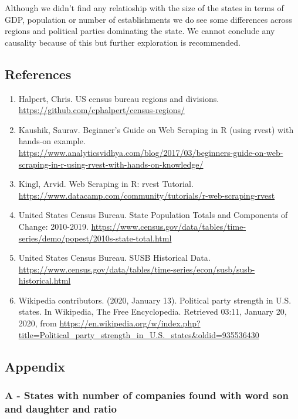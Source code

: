 \documentclass[]{article}
\begin{document}
Although we didn't find any relatioship with the size of the states in
terms of GDP, population or number of establishments we do see some
differences across regions and political parties dominating the state.
We cannot conclude any causality because of this but further exploration
is recommended.

\hypertarget{references}{%
\subsection{References}\label{references}}

\begin{enumerate}
\def\labelenumi{\arabic{enumi}.}
\item
  Halpert, Chris. US census bureau regions and divisions.
  \url{https://github.com/cphalpert/census-regions/}
\item
  Kaushik, Saurav. Beginner's Guide on Web Scraping in R (using rvest)
  with hands-on example.
  \url{https://www.analyticsvidhya.com/blog/2017/03/beginners-guide-on-web-scraping-in-r-using-rvest-with-hands-on-knowledge/}
\item
  Kingl, Arvid. Web Scraping in R: rvest Tutorial.
  \url{https://www.datacamp.com/community/tutorials/r-web-scraping-rvest}
\item
  United States Census Bureau. State Population Totals and Components of
  Change: 2010-2019.
  \url{https://www.census.gov/data/tables/time-series/demo/popest/2010s-state-total.html}
\item
  United States Census Bureau. SUSB Historical Data.
  \url{https://www.census.gov/data/tables/time-series/econ/susb/susb-historical.html}
\item
  Wikipedia contributors. (2020, January 13). Political party strength
  in U.S. states. In Wikipedia, The Free Encyclopedia. Retrieved 03:11,
  January 20, 2020, from
  \url{https://en.wikipedia.org/w/index.php?title=Political_party_strength_in_U.S._states\&oldid=935536430}
\end{enumerate}

\hypertarget{appendix}{%
\subsection{Appendix}\label{appendix}}

\hypertarget{a---states-with-number-of-companies-found-with-word-son-and-daughter-and-ratio}{%
\subsubsection{A - States with number of companies found with word son
and daughter and
ratio}\label{a---states-with-number-of-companies-found-with-word-son-and-daughter-and-ratio}}
\end{document}
